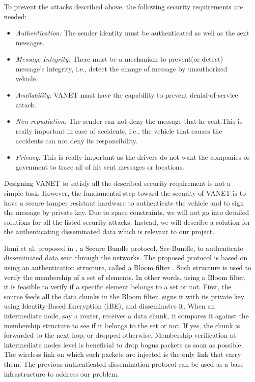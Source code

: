 \documentclass{IEEEtran}
\begin{document}
To prevent the attacks described above, the following security requirements are needed:
\begin{itemize}
\item \emph{Authentication:} The sender identity must be authenticated as well as the sent messages.
\item \emph{Message Integrity:} There must be a mechanism to prevent(or detect) message’s integrity, i.e., detect the change of message by unauthorized vehicle.
\item \emph{Availability:} VANET must have the capability to prevent denial-of-service attack.
\item \emph{Non-repudiation:} The sender can not deny the message that he sent.This is really important in case of accidents, i.e., the vehicle that causes the accidents can not deny its responsibility.
\item \emph{Privacy:} This is really important as the drivers do not want the companies or govenment to trace all of his sent messages or locations.
\end{itemize}
Designing VANET to satisfy all the described security requirement is not a simple task. However, the fundamental step toward the security of VANET is to have a secure tamper resistant hardware to authenticate the vehicle and to sign the message by private key. Due to space constraints, we will not go into detailed solutions for all the listed security attacks. Instead, we will describe a solution for the authenticating disseminated data which is relevant to our project.

Itani et al. proposed in \cite{slow}, a Secure Bundle protocol, Sec-Bundle, to authenticate disseminated data sent through the networks. The proposed protocol is based on using an authentication structure, called a Bloom filter \cite{bloomF}. Such structure is used to verify the membership of a set of elements. In other words, using a Bloom filter, it is feasible to verify if a specific element belongs to a set or not. First, the source feeds all the data chunks in the Bloom filter, signs it with its private key using Identity-Based Encryption (IBE), and disseminates it. When an intermediate node, say a router, receives a data chunk, it compares it against the membership structure to see if it belongs to the set or not. If yes, the chunk is forwarded to the next hop, or dropped otherwise. Membership verification at intermediate nodes level is beneficial to drop bogus packets as soon as possible. The wireless link on which such packets are injected is the only link that carry them. The previous authenticated dissemination protocol can be used as a base infrastructure to address our problem.
\end{document}
